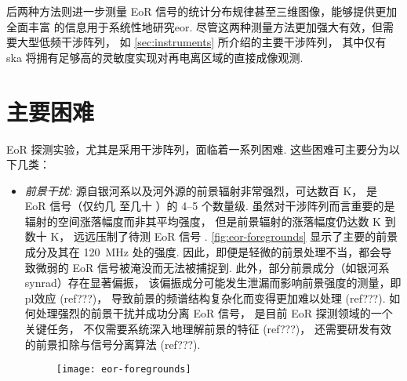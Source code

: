后两种方法则进一步测量 EoR 信号的统计分布规律甚至三维图像，能够提供更加全面丰富
的信息用于系统性地研究\acl{eor}.
尽管这两种测量方法更加强大有效，但需要大型低频干涉阵列，
如 \autoref{sec:instruments} 所介绍的主要干涉阵列，
其中仅有 \acs{ska} 将拥有足够高的灵敏度实现对再电离区域的直接成像观测.


\section{主要困难}
\label{sec:det-difficulties}

EoR 探测实验，尤其是采用干涉阵列，面临着一系列困难.
这些困难可主要分为以下几类：
\begin{itemize}
\item
\emph{前景干扰:}
源自银河系以及河外源的前景辐射非常强烈，可达数百 \si{\kelvin}，
是 EoR 信号（仅约几 \si{\mK} 至几十 \si{\mK}）的 \numrange{4}{5} 个数量级.
虽然对干涉阵列而言重要的是辐射的空间涨落幅度而非其平均强度，
但是前景辐射的涨落幅度仍达数 \si{\kelvin} 到数十 \si{\kelvin}，
远远压制了待测 EoR 信号 \cite{zaroubi2013}.
\autoref{fig:eor-foregrounds} 显示了主要的前景成分及其在
\SI{120}{\MHz} 处的强度.
因此，即便是轻微的前景处理不当，都会导致微弱的 EoR 信号被淹没而无法被捕捉到.
此外，部分前景成分（如银河系\acl{synrad}）存在显著偏振，
该偏振成分可能发生泄漏而影响前景强度的测量，即\ac{pl}效应 (ref???)，
导致前景的频谱结构复杂化而变得更加难以处理 (ref???).
如何处理强烈的前景干扰并成功分离 EoR 信号，
是目前 EoR 探测领域的一个关键任务，
不仅需要系统深入地理解前景的特征 \cite{offringa2016,carroll2016,procopio2017} (ref???)，
还需要研发有效的前景扣除与信号分离算法 \cite{chapman2015,chapman2016} (ref???).

\begin{figure}[tbp]
  \centering
  \texttt{[image: eor-foregrounds]}
  \label{fig:eor-foregrounds}
\end{figure}


\end{itemize}

